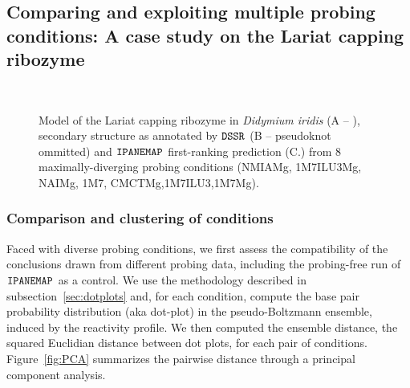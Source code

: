 \documentclass[a4,center,fleqn]{NAR}
\newcommand{\tikzcircle}[2][red,fill=red]{\tikz[baseline=-0.5ex]\draw[#1,radius=#2] (0,0) circle ;}%
\newcommand{\Software}[1]{$\text{\ttfamily #1}$}
\newcommand{\OurTool}{\Software{IPANEMAP}\xspace}
\begin{document}


\subsection{Comparing and exploiting multiple probing conditions: A case study on the Lariat capping ribozyme}
\newcommand{\Bull}[1]{{\sf\bfseries#1}~\raisebox{1.5pt}{\tikzcircle[black, fill=cluster#1]{3pt}}}


\begin{figure}
	{\\}
	
	\caption{Model of the Lariat capping ribozyme in {\itshape Didymium iridis} (A -- \citet{Meyer2014}), secondary structure as annotated by \Software{DSSR} (B -- pseudoknot ommitted) and \OurTool first-ranking prediction (C.) from 8 maximally-diverging probing conditions (NMIAMg, 1M7ILU3Mg, NAIMg, 1M7, CMCTMg,1M7ILU3,1M7Mg). }
\end{figure}



\subsubsection{Comparison and clustering of conditions}
Faced with diverse probing conditions, we first assess the compatibility of the conclusions drawn from different probing data, including the probing-free run of \OurTool as a control. We use the methodology described in subsection~\ref{sec:dotplots} and, for each condition, compute the base pair probability distribution (aka dot-plot) in the  pseudo-Boltzmann ensemble, induced by the reactivity profile. We then computed the ensemble distance, the squared Euclidian distance between dot plots, for each pair of conditions. Figure~\ref{fig:PCA} summarizes the pairwise distance through a principal component analysis.
\end{document}
